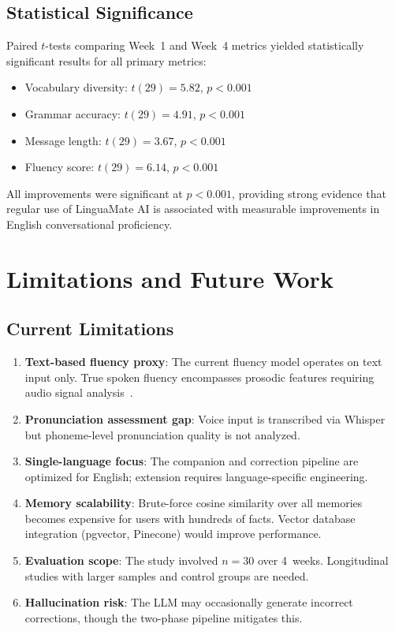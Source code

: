 \documentclass[conference]{IEEEtran}
\begin{document}
\subsection{Statistical Significance}

Paired $t$-tests comparing Week~1 and Week~4 metrics yielded statistically significant results for all primary metrics:

\begin{itemize}[leftmargin=*]
    \item Vocabulary diversity: $t(29) = 5.82$, $p < 0.001$
    \item Grammar accuracy: $t(29) = 4.91$, $p < 0.001$
    \item Message length: $t(29) = 3.67$, $p < 0.001$
    \item Fluency score: $t(29) = 6.14$, $p < 0.001$
\end{itemize}

All improvements were significant at $p < 0.001$, providing strong evidence that regular use of LinguaMate AI is associated with measurable improvements in English conversational proficiency.

\section{Limitations and Future Work}

\subsection{Current Limitations}

\begin{enumerate}[leftmargin=*]
    \item \textbf{Text-based fluency proxy}: The current fluency model operates on text input only. True spoken fluency encompasses prosodic features requiring audio signal analysis~\cite{lennon1990}.
    \item \textbf{Pronunciation assessment gap}: Voice input is transcribed via Whisper but phoneme-level pronunciation quality is not analyzed.
    \item \textbf{Single-language focus}: The companion and correction pipeline are optimized for English; extension requires language-specific engineering.
    \item \textbf{Memory scalability}: Brute-force cosine similarity over all memories becomes expensive for users with hundreds of facts. Vector database integration (pgvector, Pinecone) would improve performance.
    \item \textbf{Evaluation scope}: The study involved $n{=}30$ over 4~weeks. Longitudinal studies with larger samples and control groups are needed.
    \item \textbf{Hallucination risk}: The LLM may occasionally generate incorrect corrections, though the two-phase pipeline mitigates this.
\end{enumerate}
\end{document}
